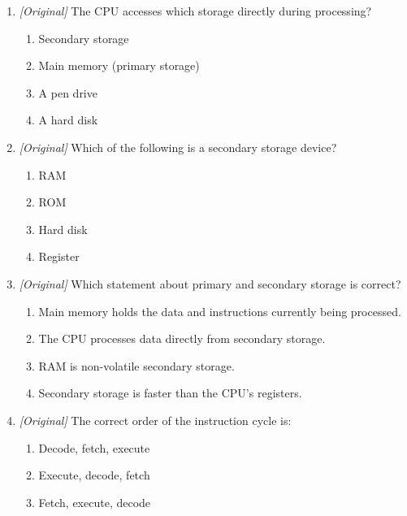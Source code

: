 \begin{enumerate}[label=\textbf{Q\arabic*.}, leftmargin=*]
  \begin{enumerate}[label=\Alph*.]
    \item The ALU performs arithmetic and logical operations.
    \item The control unit directs the sequence of operations.
    \item The CPU directly accesses secondary storage to process every
      instruction.
    \item Registers are part of the CPU.
  \end{enumerate}
\item \textit{[Original]} The CPU accesses which storage directly during
  processing?
  \begin{enumerate}[label=\Alph*.]
    \item Secondary storage
    \item Main memory (primary storage)
    \item A pen drive
    \item A hard disk
  \end{enumerate}
\item \textit{[Original]} Which of the following is a secondary storage
  device?
  \begin{enumerate}[label=\Alph*.]
    \item RAM
    \item ROM
    \item Hard disk
    \item Register
  \end{enumerate}
\item \textit{[Original]} Which statement about primary and secondary storage
  is correct?
  \begin{enumerate}[label=\Alph*.]
    \item Main memory holds the data and instructions currently being
      processed.
    \item The CPU processes data directly from secondary storage.
    \item RAM is non-volatile secondary storage.
    \item Secondary storage is faster than the CPU's registers.
  \end{enumerate}
\item \textit{[Original]} The correct order of the instruction cycle is:
  \begin{enumerate}[label=\Alph*.]
    \item Decode, fetch, execute
    \item Execute, decode, fetch
    \item Fetch, execute, decode

\end{enumerate}
\end{enumerate}

